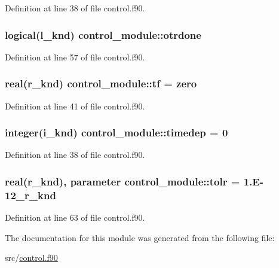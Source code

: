 Definition at line 38 of file control.\-f90.

\hypertarget{classcontrol__module_a2a2bc582701b890779931ca8180a79e4}{
\subsubsection[{otrdone}]{\setlength{\rightskip}{0pt plus 5cm}logical(l\-\_\-knd) control\-\_\-module\-::otrdone}}\label{classcontrol__module_a2a2bc582701b890779931ca8180a79e4}


Definition at line 57 of file control.\-f90.

\hypertarget{classcontrol__module_a144620f0322c0ca01d9034fedd8d1076}{
\subsubsection[{tf}]{\setlength{\rightskip}{0pt plus 5cm}real(r\-\_\-knd) control\-\_\-module\-::tf = zero}}\label{classcontrol__module_a144620f0322c0ca01d9034fedd8d1076}


Definition at line 41 of file control.\-f90.

\hypertarget{classcontrol__module_a19077c84dfe2f11b40e39a9a63178731}{
\subsubsection[{timedep}]{\setlength{\rightskip}{0pt plus 5cm}integer(i\-\_\-knd) control\-\_\-module\-::timedep = 0}}\label{classcontrol__module_a19077c84dfe2f11b40e39a9a63178731}


Definition at line 38 of file control.\-f90.

\hypertarget{classcontrol__module_ad7c6872b7fb56bee7e7870e4ffa9dc65}{
\subsubsection[{tolr}]{\setlength{\rightskip}{0pt plus 5cm}real(r\-\_\-knd), parameter control\-\_\-module\-::tolr = 1.\-E-\/12\-\_\-r\-\_\-knd}}\label{classcontrol__module_ad7c6872b7fb56bee7e7870e4ffa9dc65}


Definition at line 63 of file control.\-f90.



The documentation for this module was generated from the following file\-:\begin{DoxyCompactItemize}
\item 
src/\hyperlink{control_8f90}{control.\-f90}\end{DoxyCompactItemize}
